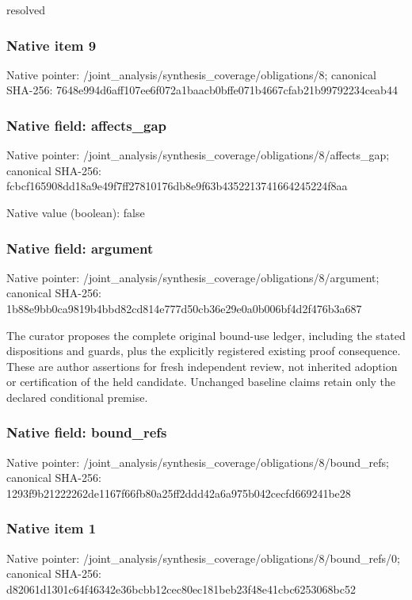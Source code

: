 \documentclass[10pt,a4paper]{article}
\begin{document}
\begingroup\raggedright\sloppy resolved\par\endgroup

\subsubsection{Native item 9}
Native pointer: /joint\_\allowbreak{}analysis/synthesis\_\allowbreak{}coverage/obligations/8; canonical SHA-256: 7648e994d6aff107ee6f072a1baacb0bffe071b4667cfab21b99792234ceab44

\subsubsection{Native field: affects\_\allowbreak{}gap}
Native pointer: /joint\_\allowbreak{}analysis/synthesis\_\allowbreak{}coverage/obligations/8/affects\_\allowbreak{}gap; canonical SHA-256: fcbcf165908dd18a9e49f7ff27810176db8e9f63b4352213741664245224f8aa

Native value (boolean): false

\subsubsection{Native field: argument}
Native pointer: /joint\_\allowbreak{}analysis/synthesis\_\allowbreak{}coverage/obligations/8/argument; canonical SHA-256: 1b88e9bb0ca9819b4bbd82cd814e777d50cb36e29e0a0b006bf4d2f476b3a687

\begingroup\raggedright\sloppy The curator proposes the complete original bound-use ledger,\allowbreak{} including the stated dispositions and guards,\allowbreak{} plus the explicitly registered existing proof consequence. These are author assertions for fresh independent review,\allowbreak{} not inherited adoption or certification of the held candidate. Unchanged baseline claims retain only the declared conditional premise.\par\endgroup

\subsubsection{Native field: bound\_\allowbreak{}refs}
Native pointer: /joint\_\allowbreak{}analysis/synthesis\_\allowbreak{}coverage/obligations/8/bound\_\allowbreak{}refs; canonical SHA-256: 1293f9b21222262de1167f66fb80a25ff2ddd42a6a975b042cecfd669241be28

\subsubsection{Native item 1}
Native pointer: /joint\_\allowbreak{}analysis/synthesis\_\allowbreak{}coverage/obligations/8/bound\_\allowbreak{}refs/0; canonical SHA-256: d82061d1301c64f46342e36bcbb12cec80ec181beb23f48e41cbc6253068bc52
\end{document}
